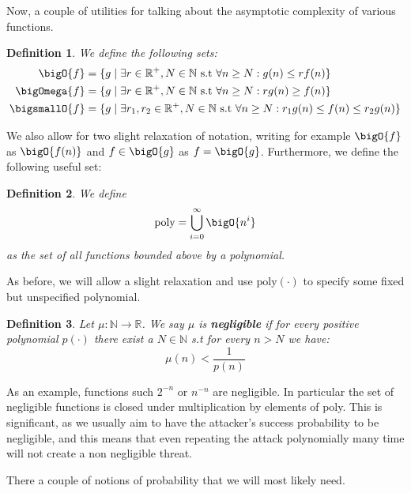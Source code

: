 \documentclass{article}
\newtheorem{definition}{Definition}
\begin{document}
Now, a couple of utilities for talking about the asymptotic complexity of various functions.

\begin{definition} We define the following sets:
\begin{align*}
    \bigO{f} &= \{ g \mid \exists r \in \mathbb{R}^+, N \in \mathbb{N} \text{ s.t } \forall n \geq N : g(n) \leq r f(n)  \} \\
    \bigOmega{f} &= \{ g \mid \exists r \in \mathbb{R}^+, N \in \mathbb{N} \text{ s.t } \forall n \geq N : r g(n) \geq f(n)  \} \\
    \bigsmallO{f} &= \{ g \mid \exists r_1,r_2 \in \mathbb{R}^+, N \in \mathbb{N} \text{ s.t } \forall n \geq N : r_1 g(n) \leq f(n) \leq r_2 g(n)  \}
\end{align*}
\end{definition}
We also allow for two slight relaxation of notation, writing for example $\bigO{f}$ as $\bigO{f(n)}$ and $f \in \bigO{g}$ as $f = \bigO{g}$. Furthermore, we define the following useful set:
\begin{definition} We define
\[\text{\normalfont{poly}} = \bigcup_{i = 0}^\infty \bigO{n^i}\]
as the set of all functions bounded above by a polynomial. 
\end{definition}
As before, we will allow a slight relaxation and use $\text{poly}(\cdot)$ to specify some fixed but unspecified polynomial.

\begin{definition}
Let $\mu : \mathbb{N} \to \mathbb{R}$. We say $\mu$ is \textbf{negligible} if for every positive polynomial $p(\cdot)$ there exist a $N \in \mathbb{N}$ s.t for every $n > N$ we have:
\[\mu(n) < \frac{1}{p(n)}\]
\end{definition}
As an example, functions such $2^{-n}$ or $n^{-n}$ are negligible. In particular the set of negligible functions is closed under multiplication by elements of poly. This is significant, as we usually aim to have the attacker's success probability to be negligible, and this means that even repeating the attack polynomially many time will not create a non negligible threat. \par

There a couple of notions of probability that we will most likely need.
\end{document}
